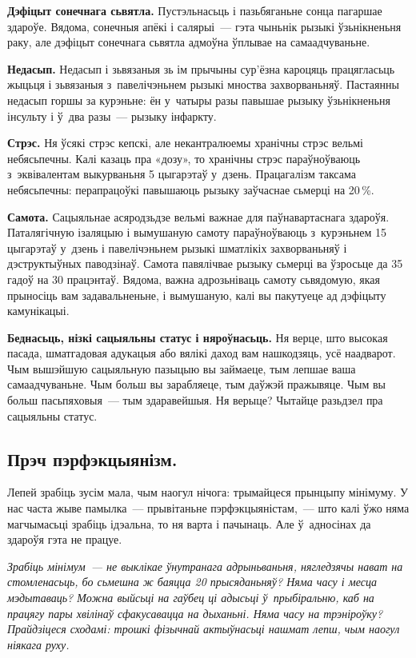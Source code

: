 \textbf{Дэфіцыт сонечнага сьвятла.} Пустэльнасьць і пазьбяганьне сонца пагаршае здароўе. Вядома, сонечныя апёкі і салярыі~--- гэта чыньнік рызыкі ўзьнікненьня раку, але дэфіцыт сонечнага сьвятла адмоўна ўплывае на самаадчуваньне.

\textbf{Недасып.} Недасып і зьвязаныя зь ім прычыны сур'ёзна кароцяць працягласьць жыцьця і зьвязаныя з~павелічэньнем рызыкі мноства захворваньняў. Пастаянны недасып горшы за курэньне: ён у~чатыры разы павышае рызыку ўзьнікненьня інсульту і ў~два разы~--- рызыку інфаркту.

\textbf{Стрэс.} Ня ўсякі стрэс кепскі, але некантралюемы хранічны стрэс вельмі небясьпечны. Калі казаць пра «дозу», то хранічны стрэс параўноўваюць з~эквівалентам выкурваньня 5 цыгарэтаў у~дзень. Працагалізм таксама небясьпечны: перапрацоўкі павышаюць рызыку заўчаснае сьмерці на 20\,\%.

\textbf{Самота.} Сацыяльнае асяродзьдзе вельмі важнае для паўнавартаснага здароўя. Паталягічную ізаляцыю і вымушаную самоту параўноўваюць з~курэньнем 15 цыгарэтаў у~дзень і павелічэньнем рызыкі шматлікіх захворваньняў і дэструктыўных паводзінаў. Самота павялічвае рызыку сьмерці ва ўзросьце да 35 гадоў на 30 працэнтаў. Вядома, важна адрозьніваць самоту сьвядомую, якая прыносіць вам задавальненьне, і вымушаную, калі вы пакутуеце ад дэфіцыту камунікацыі.

\textbf{Беднасьць, нізкі сацыяльны статус і няроўнасьць.} Ня верце, што высокая пасада, шматгадовая адукацыя або вялікі даход вам нашкодзяць, усё наадварот. Чым вышэйшую сацыяльную пазыцыю вы займаеце, тым лепшае ваша самаадчуваньне. Чым больш вы зарабляеце, тым даўжэй пражывяце. Чым вы больш пасьпяховыя~--- тым здаравейшыя. Ня верыце? Чытайце разьдзел пра сацыяльны статус.

\subsection*{Прэч пэрфэкцыянізм.}

Лепей зрабіць зусім мала, чым наогул нічога: трымайцеся прынцыпу мінімуму. У нас часта жыве памылка~--- прывітаньне пэрфэкцыяністам,~--- што калі ўжо няма магчымасьці зрабіць ідэальна, то ня варта і пачынаць. Але ў~адносінах да здароўя гэта не працуе. 


\emph{Зрабіць мінімум~--- не выклікае ўнутранага адрыньваньня, нягледзячы нават на стомленасьць, бо сьмешна ж баяцца 20 прысяданьняў? Няма часу і месца мэдытаваць? Можна выйсьці на гаўбец ці адысьці ў~прыбіральню, каб на працягу пары хвілінаў сфакусавацца на дыханьні. Няма часу на трэніроўку? Прайдзіцеся сходамі: трошкі фізычнай актыўнасьці нашмат лепш, чым наогул ніякага руху.}

